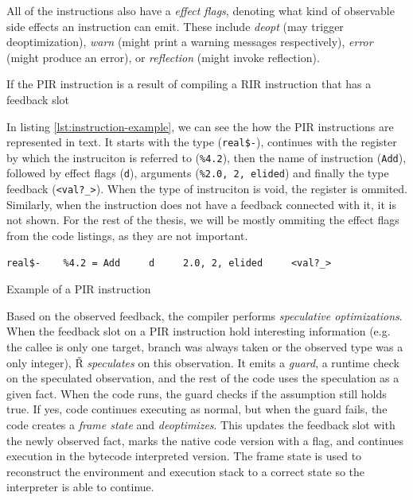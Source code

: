 All of the instructions also have a \textit{effect flags}, denoting what kind of observable side effects an instruction can emit. These include \textit{deopt} (may trigger deoptimization), \textit{warn} (might print a warning messages respectively), \textit{error} (might produce an error), or \textit{reflection} (might invoke reflection). 

If the PIR instruction is a result of compiling a RIR instruction that has a feedback slot 

In listing \ref{lst:instruction-example}, we can see the how the PIR instructions are represented in text. It starts with the type (\texttt{real\$-}), continues with the register by which the instruciton is referred to (\texttt{\%4.2}), then the name of instruction (\texttt{Add}), followed by effect flags (\texttt{d}), arguments (\texttt{\%2.0, 2, elided}) and finally the type feedback (\texttt{<val?\_>}). When the type of instruciton is void, the register is ommited. Similarly, when the instruction does not have a feedback connected with it, it is not shown. For the rest of the thesis, we will be mostly ommiting the effect flags from the code listings, as they are not important.

\begin{listing}[H]
	\begin{verbatim}
real$-    %4.2 = Add     d     2.0, 2, elided     <val?_>
  \end{verbatim}
	\caption{Example of a PIR instruction}\label{lst:instruction-example}
\end{listing}

Based on the observed feedback, the compiler performs \textit{speculative optimizations}. When the feedback slot on a PIR instruction hold interesting information (e.g. the callee is only one target, branch was always taken or the observed type was a only integer), Ř \textit{speculates} on this observation. It emits a \textit{guard}, a runtime check on the speculated observation, and the rest of the code uses the speculation as a given fact. When the code runs, the guard checks if the assumption still holds true. If yes, code continues executing as normal, but when the guard fails, the code creates a \textit{frame state} and \textit{deoptimizes}. This updates the feedback slot with the newly observed fact, marks the native code version with a flag, and continues execution in the bytecode interpreted version. The frame state is used to reconstruct the environment and execution stack to a correct state so the interpreter is able to continue. 

